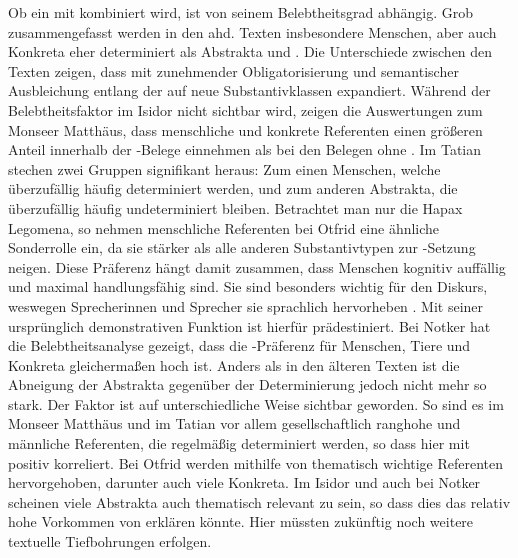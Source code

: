 Ob ein  mit  kombiniert wird, ist von seinem Belebtheitsgrad  abhängig. Grob zusammengefasst werden in den ahd. Texten insbesondere Menschen, aber auch Konkreta  eher determiniert als Abstrakta  und . Die Unterschiede zwischen den Texten zeigen, dass  mit zunehmender Obligatorisierung und semantischer Ausbleichung entlang der  auf neue Substantivklassen expandiert. Während der Belebtheitsfaktor  im Isidor nicht sichtbar wird, zeigen die Auswertungen zum Monseer Matthäus, dass menschliche und konkrete  Referenten einen größeren Anteil innerhalb der -Belege einnehmen als bei den Belegen ohne . Im Tatian stechen zwei Gruppen signifikant heraus: Zum einen Menschen, welche überzufällig häufig determiniert werden, und zum anderen  Abstrakta, die überzufällig häufig undeterminiert bleiben. Betrachtet man nur die Hapax Legomena, so nehmen menschliche Referenten bei Otfrid eine ähnliche Sonderrolle ein, da sie stärker als alle anderen Substantivtypen zur -Setzung neigen. Diese Präferenz hängt damit zusammen, dass Menschen kognitiv auffällig und maximal handlungsfähig  sind. Sie sind besonders wichtig für den Diskurs, weswegen Sprecherinnen und Sprecher sie sprachlich hervorheben . Mit seiner ursprünglich demonstrativen Funktion ist  hierfür prädestiniert.  
Bei Notker hat die Belebtheitsanalyse  gezeigt, dass die  -Präferenz für Menschen, Tiere und Konkreta  gleichermaßen hoch ist. Anders als in den älteren Texten ist die Abneigung der  Abstrakta gegenüber der Determinierung jedoch nicht mehr so stark. Der Faktor  ist auf unterschiedliche Weise sichtbar geworden. So sind es im Monseer Matthäus und im Tatian vor allem gesellschaftlich ranghohe und männliche Referenten, die regelmäßig determiniert werden, so dass hier  mit  positiv korreliert. Bei Otfrid werden mithilfe von  thematisch wichtige Referenten hervorgehoben, darunter auch viele  Konkreta. Im Isidor und auch bei Notker scheinen viele Abstrakta  auch thematisch relevant zu sein, so dass dies das relativ hohe Vorkommen von  erklären könnte. Hier müssten zukünftig noch weitere textuelle Tiefbohrungen erfolgen.


